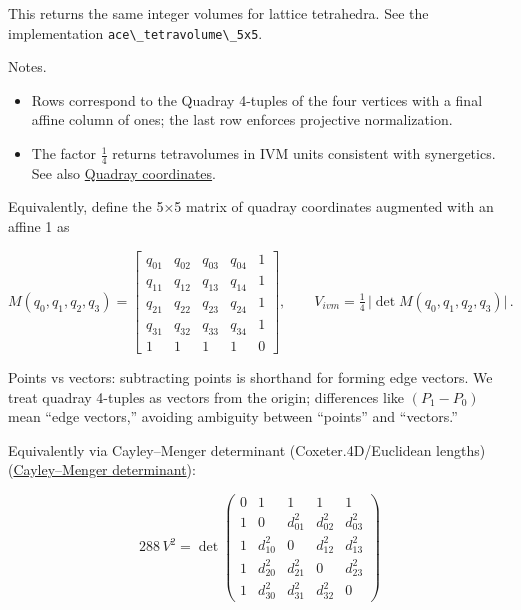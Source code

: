 \documentclass[
  10pt,
]{article}
\newcommand{\passthrough}[1]{#1}
\providecommand{\tightlist}{%
  \setlength{\itemsep}{0pt}\setlength{\parskip}{0pt}}
\begin{document}
This returns the same integer volumes for lattice tetrahedra. See the
implementation \passthrough{\lstinline!ace\_tetravolume\_5x5!}.

Notes.

\begin{itemize}
\tightlist
\item
  Rows correspond to the Quadray 4-tuples of the four vertices with a
  final affine column of ones; the last row enforces projective
  normalization.
\item
  The factor \(\tfrac{1}{4}\) returns tetravolumes in IVM units
  consistent with synergetics. See also
  \href{https://en.wikipedia.org/wiki/Quadray_coordinates}{Quadray
  coordinates}.
\end{itemize}

Equivalently, define the 5×5 matrix of quadray coordinates augmented
with an affine 1 as

\begin{equation}\label{eq:ace5x5_expanded}
M(q_0,q_1,q_2,q_3) = \begin{bmatrix}
q_{01} & q_{02} & q_{03} & q_{04} & 1 \\
q_{11} & q_{12} & q_{13} & q_{14} & 1 \\
q_{21} & q_{22} & q_{23} & q_{24} & 1 \\
q_{31} & q_{32} & q_{33} & q_{34} & 1 \\
1 & 1 & 1 & 1 & 0
\end{bmatrix},\qquad V_{ivm} = \tfrac{1}{4}\,\big|\det M(q_0,q_1,q_2,q_3)\big|\,.
\end{equation}

Points vs vectors: subtracting points is shorthand for forming edge
vectors. We treat quadray 4-tuples as vectors from the origin;
differences like \((P_1-P_0)\) mean ``edge vectors,'' avoiding ambiguity
between ``points'' and ``vectors.''

Equivalently via Cayley--Menger determinant (Coxeter.4D/Euclidean
lengths)
(\href{https://en.wikipedia.org/wiki/Cayley\%E2\%80\%93Menger_determinant}{Cayley--Menger
determinant}):

\begin{equation}\label{eq:cayley_menger}
288\,V^2 = \det\begin{pmatrix}
  0 & 1 & 1 & 1 & 1 \\
  1 & 0 & d_{01}^2 & d_{02}^2 & d_{03}^2 \\
  1 & d_{10}^2 & 0 & d_{12}^2 & d_{13}^2 \\
  1 & d_{20}^2 & d_{21}^2 & 0 & d_{23}^2 \\
  1 & d_{30}^2 & d_{31}^2 & d_{32}^2 & 0
\end{pmatrix}
\end{equation}
\end{document}
